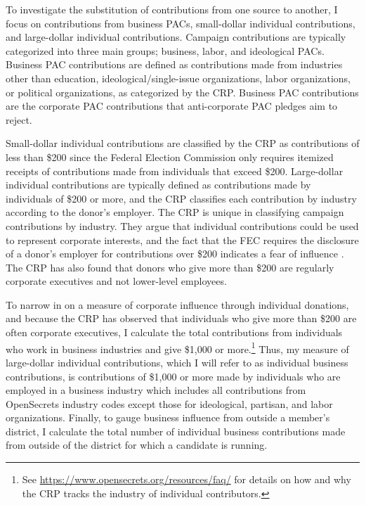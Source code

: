 \documentclass[12pt]{article}
\begin{document}
To investigate the substitution of contributions from one source to another, I focus on contributions from business PACs, small-dollar individual contributions, and large-dollar individual contributions. Campaign contributions are typically categorized into three main groups; business, labor, and ideological PACs. Business PAC contributions are defined as contributions made from industries other than education, ideological/single-issue organizations, labor organizations, or political organizations, as categorized by the CRP. Business PAC contributions are the corporate PAC contributions that anti-corporate PAC pledges aim to reject.   

Small-dollar individual contributions are classified by the CRP as contributions of less than \$200 since the Federal Election Commission only requires itemized receipts of contributions made from individuals that exceed \$200. Large-dollar individual contributions are typically defined as contributions made by individuals of \$200 or more, and the CRP classifies each contribution by industry according to the donor's employer. The CRP is unique in classifying campaign contributions by industry. They argue that individual contributions could be used to represent corporate interests, and the fact that the FEC requires the disclosure of a donor's employer for contributions over \$200 indicates a fear of influence \citep{opensecrets.orga}. The CRP has also found that donors who give more than \$200 are regularly corporate executives and not lower-level employees. 

To narrow in on a measure of corporate influence through individual donations, and because the CRP has observed that individuals who give more than \$200 are often corporate executives, I calculate the total contributions from individuals who work in business industries and give \$1,000 or more.\footnote{See \href{https://www.opensecrets.org/resources/faq/}{https://www.opensecrets.org/resources/faq/} for details on how and why the CRP tracks the industry of individual contributors.} Thus, my measure of large-dollar individual contributions, which I will refer to as individual business contributions, is contributions of \$1,000 or more made by individuals who are employed in a business industry which includes all contributions from OpenSecrets industry codes except those for ideological, partisan, and labor organizations. Finally, to gauge business influence from outside a member's district, I calculate the total number of individual business contributions made from outside of the district for which a candidate is running.  
\end{document}
